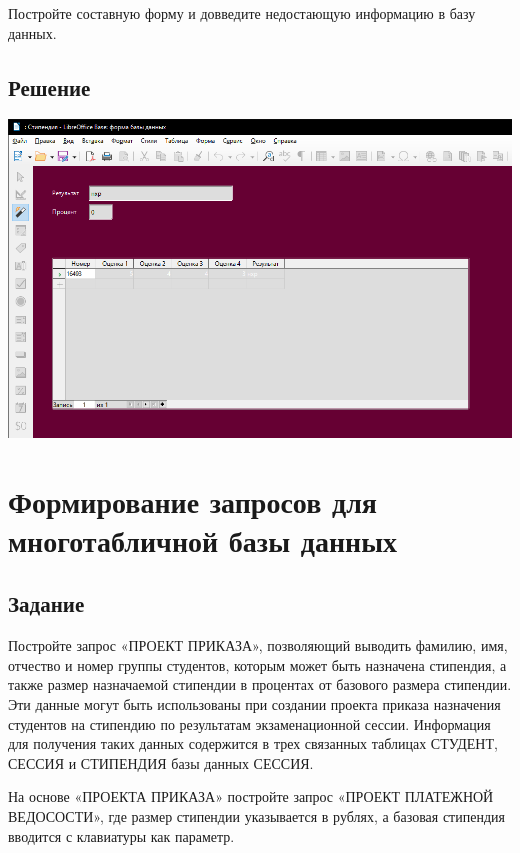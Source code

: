 \documentclass[a4paper, 12pt]{article}
\begin{document}
Постройте  составную  форму  и  довведите  недостающую 
информацию в базу данных. 
\subsection{Решение}
\includegraphics[width=\textwidth]{"9-1.png"}\\

\section{Формирование запросов для многотабличной базы 
данных }
\subsection{Задание}
Постройте  запрос  «ПРОЕКТ  ПРИКАЗА»,  позволяющий  выводить 
фамилию, имя, отчество и номер группы студентов, которым может быть 
назначена  стипендия,  а  также  размер  назначаемой  стипендии  в 
процентах  от  базового  размера  стипендии.  Эти  данные  могут  быть 
использованы при создании проекта приказа назначения студентов на 
стипендию по результатам экзаменационной сессии. Информация для 
получения  таких  данных  содержится  в  трех  связанных  таблицах 
СТУДЕНТ, СЕССИЯ и СТИПЕНДИЯ базы данных СЕССИЯ. 

На  основе  «ПРОЕКТА  ПРИКАЗА»  постройте  запрос  «ПРОЕКТ 
ПЛАТЕЖНОЙ ВЕДОСОСТИ», где размер стипендии указывается в рублях, 
а базовая стипендия вводится с клавиатуры как параметр. 
\end{document}
